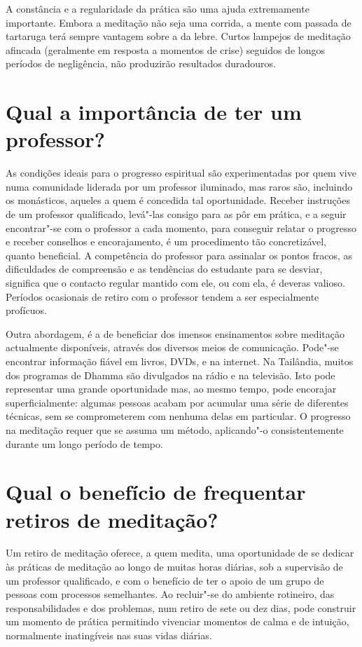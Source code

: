 A constância e a regularidade da prática são uma ajuda extremamente
importante. Embora a meditação não seja uma corrida, a mente com passada
de tartaruga terá sempre vantagem sobre a da lebre. Curtos lampejos de
meditação afincada (geralmente em resposta a momentos de crise) seguidos
de longos períodos de negligência, não produzirão resultados duradouros.

\section{Qual a importância de ter um professor?}

As condições ideais para o progresso espiritual são experimentadas por
quem vive numa comunidade liderada por um professor iluminado, mas raros
são, incluindo os monásticos, aqueles a quem é concedida tal
oportunidade. Receber instruções de um professor qualificado, levá"-las
consigo para as pôr em prática, e a seguir encontrar"-se com o professor
a cada momento, para conseguir relatar o progresso e receber conselhos
e encorajamento, é um procedimento tão concretizável, quanto beneficial.
A competência do professor para assinalar os pontos fracos, as
dificuldades de compreensão e as tendências do estudante para se
desviar, significa que o contacto regular mantido com ele, ou com ela, é
deveras valioso. Períodos ocasionais de retiro com o professor tendem a
ser especialmente profícuos.

Outra abordagem, é a de beneficiar dos imensos ensinamentos sobre
meditação actualmente disponíveis, através dos diversos meios de
comunicação. Pode"-se encontrar informação fiável em livros, DVDs, e na
internet. Na Tailândia, muitos dos programas de Dhamma são divulgados na
rádio e na televisão. Isto pode representar uma grande oportunidade mas,
ao mesmo tempo, pode encorajar superficialmente: algumas pessoas acabam
por acumular uma série de diferentes técnicas, sem se comprometerem com
nenhuma delas em particular. O progresso na meditação requer que se
assuma um método, aplicando"-o consistentemente durante um longo período
de tempo.

\section{Qual o benefício de frequentar retiros de meditação?}

Um retiro de meditação oferece, a quem medita, uma oportunidade de se
dedicar às práticas de meditação ao longo de muitas horas diárias, sob a
supervisão de um professor qualificado, e com o benefício de ter o apoio
de um grupo de pessoas com processos semelhantes. Ao recluir"-se do
ambiente rotineiro, das responsabilidades e dos problemas, num retiro de
sete ou dez dias, pode construir um momento de prática permitindo
vivenciar momentos de calma e de intuição, normalmente inatingíveis nas
suas vidas diárias.

